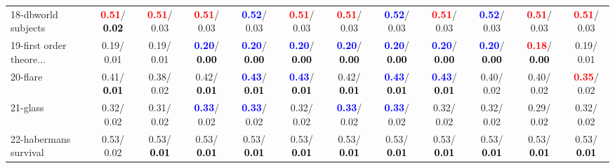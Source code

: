 \begin{table}[h]
\begin{center}
{\begin{tabular}{lc|c|c|c|c|c|c|c|c|c|c}
18-dbworld subjects & \textcolor{red}{\textbf{  0.51}}/\textcolor{black}{\textbf{  0.02}} & \textcolor{red}{\textbf{  0.51}}/  0.03 & \textcolor{red}{\textbf{  0.51}}/  0.03 & \textcolor{blue}{\textbf{  0.52}}/  0.03 & \textcolor{red}{\textbf{  0.51}}/  0.03 & \textcolor{red}{\textbf{  0.51}}/  0.03 & \textcolor{blue}{\textbf{  0.52}}/  0.03 & \textcolor{red}{\textbf{  0.51}}/  0.03 & \textcolor{blue}{\textbf{  0.52}}/  0.03 & \textcolor{red}{\textbf{  0.51}}/  0.03 & \textcolor{red}{\textbf{  0.51}}/  0.03 \\
19-first order theore... &   0.19/  0.01 &   0.19/  0.01 & \textcolor{blue}{\textbf{  0.20}}/\textcolor{black}{\textbf{  0.00}} & \textcolor{blue}{\textbf{  0.20}}/\textcolor{black}{\textbf{  0.00}} & \textcolor{blue}{\textbf{  0.20}}/\textcolor{black}{\textbf{  0.00}} & \textcolor{blue}{\textbf{  0.20}}/\textcolor{black}{\textbf{  0.00}} & \textcolor{blue}{\textbf{  0.20}}/\textcolor{black}{\textbf{  0.00}} & \textcolor{blue}{\textbf{  0.20}}/\textcolor{black}{\textbf{  0.00}} & \textcolor{blue}{\textbf{  0.20}}/\textcolor{black}{\textbf{  0.00}} & \textcolor{red}{\textbf{  0.18}}/\textcolor{black}{\textbf{  0.00}} &   0.19/  0.01 \\
20-flare &   0.41/\textcolor{black}{\textbf{  0.01}} &   0.38/  0.02 &   0.42/\textcolor{black}{\textbf{  0.01}} & \textcolor{blue}{\textbf{  0.43}}/\textcolor{black}{\textbf{  0.01}} & \textcolor{blue}{\textbf{  0.43}}/\textcolor{black}{\textbf{  0.01}} &   0.42/\textcolor{black}{\textbf{  0.01}} & \textcolor{blue}{\textbf{  0.43}}/\textcolor{black}{\textbf{  0.01}} & \textcolor{blue}{\textbf{  0.43}}/\textcolor{black}{\textbf{  0.01}} &   0.40/  0.02 &   0.40/  0.02 & \textcolor{red}{\textbf{  0.35}}/  0.02 \\
21-glass &   0.32/  0.02 &   0.31/  0.02 & \textcolor{blue}{\textbf{  0.33}}/  0.02 & \textcolor{blue}{\textbf{  0.33}}/  0.02 &   0.32/  0.02 & \textcolor{blue}{\textbf{  0.33}}/  0.02 & \textcolor{blue}{\textbf{  0.33}}/  0.02 &   0.32/  0.02 &   0.32/  0.02 &   0.29/  0.02 &   0.32/  0.02 \\ \hline
22-habermans survival &   0.53/  0.02 &   0.53/\textcolor{black}{\textbf{  0.01}} &   0.53/\textcolor{black}{\textbf{  0.01}} &   0.53/\textcolor{black}{\textbf{  0.01}} &   0.53/\textcolor{black}{\textbf{  0.01}} &   0.53/\textcolor{black}{\textbf{  0.01}} &   0.53/\textcolor{black}{\textbf{  0.01}} &   0.53/\textcolor{black}{\textbf{  0.01}} &   0.53/\textcolor{black}{\textbf{  0.01}} &   0.53/\textcolor{black}{\textbf{  0.01}} &   0.53/\textcolor{black}{\textbf{  0.01}} \\

\end{tabular}}
\end{center}
\end{table}
